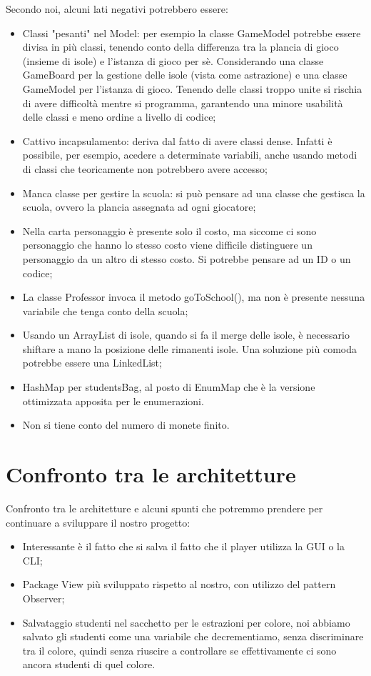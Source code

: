 \documentclass[12pt]{article}
\begin{document}
Secondo noi, alcuni lati negativi potrebbero essere: \begin{itemize} \item Classi "pesanti" nel Model: per esempio la classe GameModel potrebbe essere divisa in più classi, tenendo conto della differenza tra la plancia di gioco (insieme di isole) e l'istanza di gioco per sè. Considerando una classe GameBoard per la gestione delle isole (vista come astrazione) e una classe GameModel per l'istanza di gioco. Tenendo delle classi troppo unite si rischia di avere difficoltà mentre si programma, garantendo una minore usabilità delle classi e meno ordine a livello di codice; \item Cattivo incapsulamento: deriva dal fatto di avere classi dense. Infatti è possibile, per esempio, acedere a determinate variabili, anche usando metodi di classi che teoricamente non potrebbero avere accesso; \item Manca classe per gestire la scuola: si può pensare ad una classe che gestisca la scuola, ovvero la plancia assegnata ad ogni giocatore; \item Nella carta personaggio è presente solo il costo, ma siccome ci sono personaggio che hanno lo stesso costo viene difficile distinguere un personaggio da un altro di stesso costo. Si potrebbe pensare ad un ID o un codice; \item La classe Professor invoca il metodo goToSchool(), ma non è presente nessuna variabile che tenga conto della scuola; \item Usando un ArrayList di isole, quando si fa il merge delle isole, è necessario shiftare a mano la posizione delle rimanenti isole. Una soluzione più comoda potrebbe essere una LinkedList; \item HashMap per studentsBag, al posto di EnumMap che è la versione ottimizzata apposita per le enumerazioni. \item Non si tiene conto del numero di monete finito.\end{itemize}

\section{Confronto tra le architetture}

Confronto tra le architetture e alcuni spunti che potremmo prendere per continuare a sviluppare il nostro progetto: \begin{itemize} \item Interessante è il fatto che si salva il fatto che il player utilizza la GUI o la CLI; \item Package View più sviluppato rispetto al nostro, con utilizzo del pattern Observer; \item Salvataggio studenti nel sacchetto per le estrazioni per colore, noi abbiamo salvato gli studenti come una variabile che decrementiamo, senza discriminare tra il colore, quindi senza riuscire a controllare se effettivamente ci sono ancora studenti di quel colore. \end{itemize}
\end{document}

